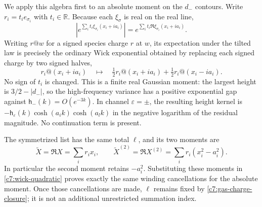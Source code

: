 We apply this algebra first to an absolute moment on the $d_-$ contours.
Write $r_i=t_i e_{\sigma_i}$ with $t_i\in\mathbb R$.  Because each
$\xi_\sigma$ is real on the real line,
\[
\left|e^{\sum_i t_i\xi_{\sigma_i}(x_i+ia_i)}\right|
=e^{\sum_i t_i\Re\xi_{\sigma_i}(x_i+ia_i)}.
\]
Writing $r@w$ for a signed species charge $r$ at $w$, its expectation under
the tilted law is precisely the ordinary Wick exponential obtained by
replacing each signed charge by two signed halves,
\begin{equation}\label{c7:symmetrized-charges}
r_i@(x_i+ia_i)\quad\longmapsto\quad
\tfrac12r_i@(x_i+ia_i)+\tfrac12r_i@(x_i-ia_i).
\end{equation}
No sign of $t_i$ is changed.  This is a finite real Gaussian moment: the
largest height is $3/2-|d_-|$, so the high-frequency variance has a positive
exponential gap against $\mathsf h_-(k)=O(e^{-3k})$.  In channel $\varepsilon=\pm$,
the resulting height kernel is
$-\mathsf h_\varepsilon(k)\cosh(a_i k)\cosh(a_l k)$ in the negative logarithm of
the residual magnitude.  No continuation term is present.

The symmetrized list has the same total $\boldsymbol\ell$, and its two
moments are
\begin{equation}\label{c7:symmetrized-moments}
\widetilde X=\Re X=\sum_i r_ix_i,\qquad
\widetilde X^{(2)}=\Re X^{(2)}=\sum_i r_i(x_i^2-a_i^2).
\end{equation}
In particular the second moment retains $-a_i^2$.  Substituting these
moments in \eqref{c7:wick-quadratic} proves exactly the same winding
cancellations for the absolute moment.  Once those cancellations are made,
$\boldsymbol\ell$ remains fixed by \eqref{c7:gas-charge-closure}; it is not
an additional unrestricted summation index.

